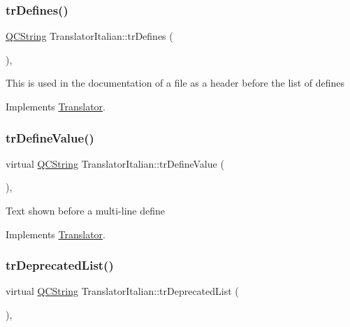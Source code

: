 \subsubsection{\texorpdfstring{trDefines()}{trDefines()}}
{\footnotesize\ttfamily \mbox{\hyperlink{class_q_c_string}{Q\+C\+String}} Translator\+Italian\+::tr\+Defines (\begin{DoxyParamCaption}{ }\end{DoxyParamCaption})\hspace{0.3cm}{\ttfamily [inline]}, {\ttfamily [virtual]}}

This is used in the documentation of a file as a header before the list of defines 

Implements \mbox{\hyperlink{class_translator}{Translator}}.

\mbox{\label{class_translator_italian_a0a727d05e312fe42fa6e8888bf569476}} 
\subsubsection{\texorpdfstring{trDefineValue()}{trDefineValue()}}
{\footnotesize\ttfamily virtual \mbox{\hyperlink{class_q_c_string}{Q\+C\+String}} Translator\+Italian\+::tr\+Define\+Value (\begin{DoxyParamCaption}{ }\end{DoxyParamCaption})\hspace{0.3cm}{\ttfamily [inline]}, {\ttfamily [virtual]}}

Text shown before a multi-\/line define 

Implements \mbox{\hyperlink{class_translator}{Translator}}.

\mbox{\label{class_translator_italian_a09ebd757487d5ff33c57b0bafbba9d66}} 
\subsubsection{\texorpdfstring{trDeprecatedList()}{trDeprecatedList()}}
{\footnotesize\ttfamily virtual \mbox{\hyperlink{class_q_c_string}{Q\+C\+String}} Translator\+Italian\+::tr\+Deprecated\+List (\begin{DoxyParamCaption}{ }\end{DoxyParamCaption})\hspace{0.3cm}{\ttfamily [inline]}, {\ttfamily [virtual]}}

